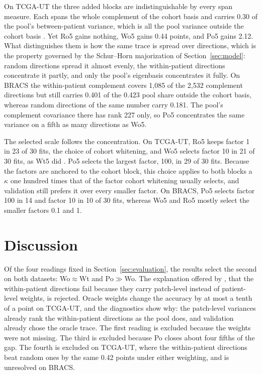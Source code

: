 \noindent On TCGA-UT the three added blocks are indistinguishable by every span measure. Each spans the whole complement of the cohort basis and carries 0.30 of the pool's between-patient variance, which is all the pool variance outside the cohort basis \citep{queisler2026spectrumRegularization}. Yet Ro5 gains nothing, Wo5 gains 0.44 points, and Po5 gains 2.12. What distinguishes them is how the same trace is spread over directions, which is the property governed by the Schur--Horn majorization of Section~\ref{sec:model}: random directions spread it almost evenly, the within-patient directions concentrate it partly, and only the pool's eigenbasis concentrates it fully. On BRACS the within-patient complement covers 1,085 of the 2,532 complement directions but still carries 0.401 of the 0.423 pool share outside the cohort basis, whereas random directions of the same number carry 0.181. The pool's complement covariance there has rank 227 only, so Po5 concentrates the same variance on a fifth as many directions as Wo5.

The selected scale follows the concentration. On TCGA-UT, Ro5 keeps factor 1 in 23 of 30 fits, the choice of cohort whitening, and Wo5 selects factor 10 in 21 of 30 fits, as Wt5 did \citep{queisler2026withinPatientSpan}. Po5 selects the largest factor, 100, in 29 of 30 fits. Because the factors are anchored to the cohort block, this choice applies to both blocks a $\kappa$ one hundred times that of the factor cohort whitening usually selects, and validation still prefers it over every smaller factor. On BRACS, Po5 selects factor 100 in 14 and factor 10 in 10 of 30 fits, whereas Wo5 and Ro5 mostly select the smaller factors 0.1 and 1.

\section{Discussion}
\label{sec:discussion}
Of the four readings fixed in Section~\ref{sec:evaluation}, the results select the second on both datasets: Wo$\approx$Wt and Po$\gg$Wo. The explanation offered by \citet{queisler2026withinPatientSpan}, that the within-patient directions fail because they carry patch-level instead of patient-level weights, is rejected. Oracle weights change the accuracy by at most a tenth of a point on TCGA-UT, and the diagnostics show why: the patch-level variances already rank the within-patient directions as the pool does, and validation already chose the oracle trace. The first reading is excluded because the weights were not missing. The third is excluded because Po closes about four fifths of the gap. The fourth is excluded on TCGA-UT, where the within-patient directions beat random ones by the same 0.42 points under either weighting, and is unresolved on BRACS.

